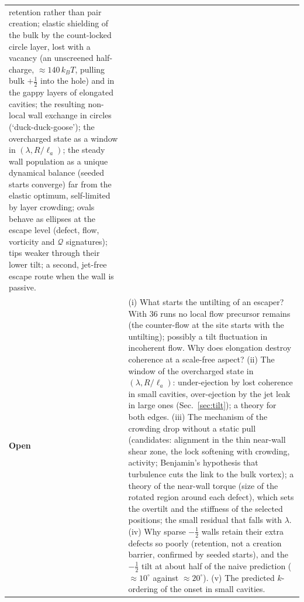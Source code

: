 \documentclass[11pt,a4paper]{article}
\newcommand{\half}{\tfrac12}
\newcommand{\la}{\ell_a}
\newcommand{\kT}{k_BT}
\begin{document}
\begin{table}[H]
\begin{tabularx}{\textwidth}{@{}lX@{}}
retention rather than pair creation; elastic shielding of the bulk by the count-locked circle layer, lost with a
vacancy (an unscreened half-charge, $\approx140\,\kT$, pulling bulk $+\half$ into the hole) and in the gappy layers of elongated cavities; the resulting non-local wall exchange in circles
(`duck-duck-goose'); the overcharged state as a window in $(\lambda,R/\la)$;
the steady wall population as a unique dynamical balance (seeded starts converge) far from the elastic optimum, self-limited by layer crowding; ovals behave as ellipses at the escape level (defect, flow, vorticity and $\mathcal Q$ signatures); tips weaker through their lower tilt; a second, jet-free escape
route when the wall is passive. \\
\textbf{Open} & (i) What starts the untilting of an escaper? With 36 runs no local flow precursor remains (the counter-flow at the site starts with the untilting); possibly a tilt fluctuation in incoherent flow. Why does elongation destroy coherence at a scale-free aspect?
(ii) The window of the overcharged state in $(\lambda,R/\la)$: under-ejection by lost coherence in small cavities, over-ejection by the jet leak in large ones (Sec.~\ref{sec:tilt}); a theory for both edges. (iii) The mechanism of the crowding drop without a static pull (candidates: alignment in the thin near-wall shear zone, the lock softening with crowding, activity; Benjamin's hypothesis that turbulence cuts the link to the bulk vortex);
a theory of the near-wall torque (size of the rotated region around each defect), which sets the overtilt and the stiffness of the selected positions; the small residual that falls with $\lambda$.
(iv) Why sparse $-\half$ walls retain their extra defects so poorly (retention, not a creation barrier, confirmed by seeded starts), and the $-\half$ tilt at about half of the naive prediction ($\approx10^\circ$ against $\approx20^\circ$). (v) The predicted $k$-ordering of the onset in small cavities. \\
\bottomrule
\end{tabularx}
\end{table}
\end{document}
